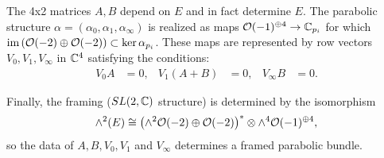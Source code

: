 	The 4x2 matrices $A,B$ depend on $E$ and in fact determine $E$. The parabolic structure $\alpha = (\alpha_0,\alpha_1,\alpha_\infty)$ is realized as maps $\mathcal{O}(-1)^{\oplus 4}\to \mathbb{C}_{p_i}$ for which $\text{im}\left(\mathcal{O}(-2)\oplus\mathcal{O}(-2)\right) \subset \ker\alpha_{p_i}$. These maps are represented by row vectors $V_0,V_1,V_\infty$ in $\mathbb{C}^4$ satisfying the conditions:
	\begin{align}
		V_0 A &=0, & V_1(A+B) &= 0, & V_\infty B &=0.
	\end{align}
	
	Finally, the framing ($SL(2,\mathbb{C})$ structure) is determined by the isomorphism
	\begin{equation}
		\wedge^2 (E) \cong \left(\wedge^2 \mathcal{O}(-2)\oplus \mathcal{O}(-2)\right)^\ast\otimes \wedge^4\mathcal{O}(-1)^{\oplus 4},
	\end{equation}
	so the data of $A,B, V_0,V_1$ and $V_\infty$ determines a framed parabolic bundle.
	
